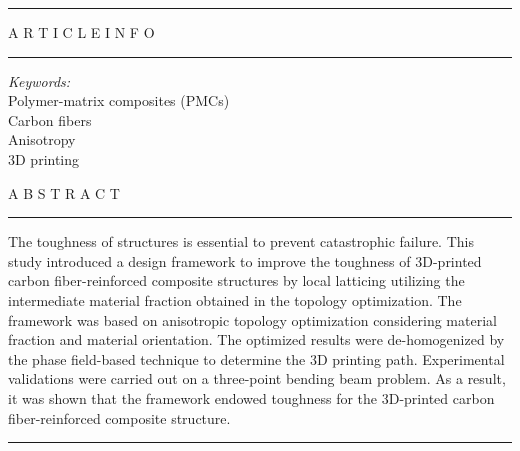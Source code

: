 \documentclass[a4paper,7pt,fleqn]{article}   %
\begin{document}
	\vspace{90pt}
	{\small \selectfont {}}
	
	\thispagestyle{empty}
	
	\noindent
	\begin{minipage}[t]{\textwidth}
		\noindent \rule{\textwidth}{0.05em}
		\begin{minipage}[t]{0.3\textwidth}
			\vspace{2pt}
			{A R T I C L E I N F O} \\
			\rule{\textwidth}{0.05em}
			{\fontsize{7pt}{0.8} \selectfont \textit{Keywords:} \\Polymer-matrix composites (PMCs) \\ Carbon fibers \\ Anisotropy \\ 3D printing}
		\end{minipage}
		\hfill
		\begin{minipage}[t]{0.65\textwidth}
			\vspace{2pt}
			{A B S T R A C T} \\
			\rule{\textwidth}{0.05em}
			{\fontsize{7pt}{0.8} \selectfont The toughness of structures is essential to prevent catastrophic failure. This study introduced a design framework to improve the toughness of 3D-printed carbon fiber-reinforced composite structures by local latticing utilizing the intermediate material fraction obtained in the topology optimization. The framework was based on anisotropic topology optimization considering material fraction and material orientation. The optimized results were de-homogenized by the phase field-based technique to determine the 3D printing path. Experimental validations were carried out on a three-point bending beam problem. As a result, it was shown that the framework endowed toughness for the 3D-printed carbon fiber-reinforced composite structure.}\\
		\end{minipage}
		\noindent \rule{\textwidth}{0.05em}
	\end{minipage}
	\vspace{10pt}
	
\end{document}
